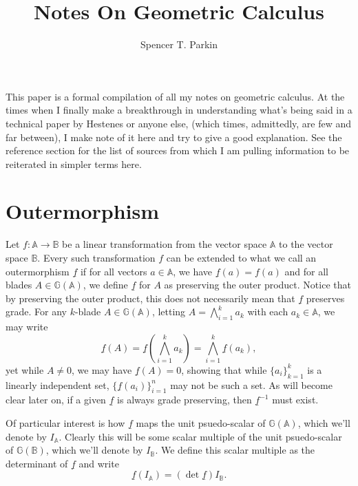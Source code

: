 \documentclass[12pt]{article}
\title{Notes On Geometric Calculus}
\author{Spencer T. Parkin}
\newcommand{\G}{\mathbb{G}}
\newcommand{\A}{\mathbb{A}}
\newcommand{\B}{\mathbb{B}}
\newcommand{\ub}{\underline}
\begin{document}
\maketitle

This paper is a formal compilation of all my notes on geometric calculus.
At the times when I finally make a breakthrough in understanding what's
being said in a technical paper by Hestenes or anyone else, (which times,
admittedly, are few and far between), I make note of it here and try to
give a good explanation.  See the reference section for the list of
sources from which I am pulling information to be reiterated in simpler
terms here.
\nocite{hestenes91}
\nocite{macdonald12}

\section{Outermorphism}

Let $f:\A\to\B$ be a linear transformation from the vector space $\A$
to the vector space $\B$.  Every such transformation $f$ can be
extended to what we call an outermorphism $\ub{f}$ if for all
vectors $a\in\A$, we have $\ub{f}(a)=f(a)$ and for all blades $A\in\G(\A)$,
we define $\ub{f}$ for $A$ as preserving the outer product.
Notice that by preserving the outer product, this does not necessarily
mean that $\ub{f}$ preserves grade.
For any $k$-blade $A\in\G(\A)$, letting $A=\bigwedge_{i=1}^k a_k$ with
each $a_k\in\A$, we may write
\begin{equation*}
\ub{f}(A)=\ub{f}\left(\bigwedge_{i=1}^k a_k\right) = \bigwedge_{i=1}^k\ub{f}(a_k),
\end{equation*}
yet while $A\neq 0$, we may have $\ub{f}(A)=0$, showing that while $\{a_i\}_{k=1}^k$
is a linearly independent set, $\{\ub{f}(a_i)\}_{i=1}^n$ may not be such a set.  As will become clear
later on, if a given $\ub{f}$ is always grade preserving, then $\ub{f}^{-1}$ must exist.

Of particular interest is how $\ub{f}$ maps the
unit psuedo-scalar of $\G(\A)$, which we'll denote by $I_{\A}$.  Clearly this
will be some scalar multiple of the unit psuedo-scalar of $\G(\B)$, which we'll
denote by $I_{\B}$.  We define this scalar multiple as the determinant of $\ub{f}$
and write
\begin{equation*}
\ub{f}(I_{\A}) = \left(\det\ub{f}\right)I_{\B}.
\end{equation*}
\end{document}
